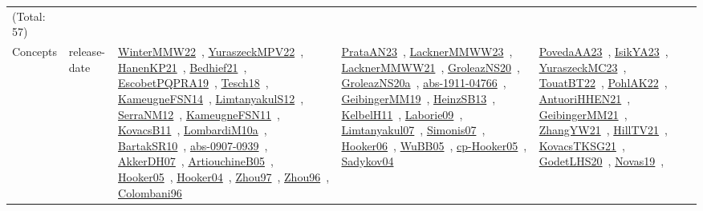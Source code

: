 {\begin{longtable}{lp{3cm}>{\raggedright\arraybackslash}p{6cm}>{\raggedright\arraybackslash}p{6cm}>{\raggedright\arraybackslash}p{8cm}}
(Total: 57)\\
Concepts & release-date & \href{papers/WinterMMW22.pdf}{WinterMMW22}~\cite{WinterMMW22}, \href{articles/YuraszeckMPV22.pdf}{YuraszeckMPV22}~\cite{YuraszeckMPV22}, \href{papers/HanenKP21.pdf}{HanenKP21}~\cite{HanenKP21}, \href{articles/Bedhief21.pdf}{Bedhief21}~\cite{Bedhief21}, \href{articles/EscobetPQPRA19.pdf}{EscobetPQPRA19}~\cite{EscobetPQPRA19}, \href{papers/Tesch18.pdf}{Tesch18}~\cite{Tesch18}, \href{articles/KameugneFSN14.pdf}{KameugneFSN14}~\cite{KameugneFSN14}, \href{articles/LimtanyakulS12.pdf}{LimtanyakulS12}~\cite{LimtanyakulS12}, \href{papers/SerraNM12.pdf}{SerraNM12}~\cite{SerraNM12}, \href{papers/KameugneFSN11.pdf}{KameugneFSN11}~\cite{KameugneFSN11}, \href{articles/KovacsB11.pdf}{KovacsB11}~\cite{KovacsB11}, \href{articles/LombardiM10a.pdf}{LombardiM10a}~\cite{LombardiM10a}, \href{articles/BartakSR10.pdf}{BartakSR10}~\cite{BartakSR10}, \href{articles/abs-0907-0939.pdf}{abs-0907-0939}~\cite{abs-0907-0939}, \href{papers/AkkerDH07.pdf}{AkkerDH07}~\cite{AkkerDH07}, \href{papers/ArtiouchineB05.pdf}{ArtiouchineB05}~\cite{ArtiouchineB05}, \href{articles/Hooker05.pdf}{Hooker05}~\cite{Hooker05}, \href{papers/Hooker04.pdf}{Hooker04}~\cite{Hooker04}, \href{articles/Zhou97.pdf}{Zhou97}~\cite{Zhou97}, \href{papers/Zhou96.pdf}{Zhou96}~\cite{Zhou96}, \href{papers/Colombani96.pdf}{Colombani96}~\cite{Colombani96} & \href{articles/PrataAN23.pdf}{PrataAN23}~\cite{PrataAN23}, \href{articles/LacknerMMWW23.pdf}{LacknerMMWW23}~\cite{LacknerMMWW23}, \href{papers/LacknerMMWW21.pdf}{LacknerMMWW21}~\cite{LacknerMMWW21}, \href{papers/GroleazNS20.pdf}{GroleazNS20}~\cite{GroleazNS20}, \href{papers/GroleazNS20a.pdf}{GroleazNS20a}~\cite{GroleazNS20a}, \href{articles/abs-1911-04766.pdf}{abs-1911-04766}~\cite{abs-1911-04766}, \href{papers/GeibingerMM19.pdf}{GeibingerMM19}~\cite{GeibingerMM19}, \href{articles/HeinzSB13.pdf}{HeinzSB13}~\cite{HeinzSB13}, \href{articles/KelbelH11.pdf}{KelbelH11}~\cite{KelbelH11}, \href{papers/Laborie09.pdf}{Laborie09}~\cite{Laborie09}, \href{papers/Limtanyakul07.pdf}{Limtanyakul07}~\cite{Limtanyakul07}, \href{articles/Simonis07.pdf}{Simonis07}~\cite{Simonis07}, \href{articles/Hooker06.pdf}{Hooker06}~\cite{Hooker06}, \href{papers/WuBB05.pdf}{WuBB05}~\cite{WuBB05}, \href{papers/cp-Hooker05.pdf}{cp-Hooker05}~\cite{cp-Hooker05}, \href{papers/Sadykov04.pdf}{Sadykov04}~\cite{Sadykov04} & \href{papers/PovedaAA23.pdf}{PovedaAA23}~\cite{PovedaAA23}, \href{articles/IsikYA23.pdf}{IsikYA23}~\cite{IsikYA23}, \href{papers/YuraszeckMC23.pdf}{YuraszeckMC23}~\cite{YuraszeckMC23}, \href{papers/TouatBT22.pdf}{TouatBT22}~\cite{TouatBT22}, \href{articles/PohlAK22.pdf}{PohlAK22}~\cite{PohlAK22}, \href{papers/AntuoriHHEN21.pdf}{AntuoriHHEN21}~\cite{AntuoriHHEN21}, \href{papers/GeibingerMM21.pdf}{GeibingerMM21}~\cite{GeibingerMM21}, \href{articles/ZhangYW21.pdf}{ZhangYW21}~\cite{ZhangYW21}, \href{papers/HillTV21.pdf}{HillTV21}~\cite{HillTV21}, \href{papers/KovacsTKSG21.pdf}{KovacsTKSG21}~\cite{KovacsTKSG21}, \href{papers/GodetLHS20.pdf}{GodetLHS20}~\cite{GodetLHS20}, \href{articles/Novas19.pdf}{Novas19}~\cite{Novas19}, 
\end{longtable}}
